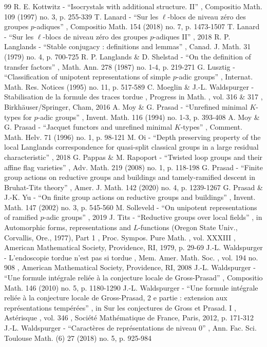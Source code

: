 \documentclass[11pt]{article}
\numberwithin{equation}{section}\providecommand{\og}{«\,}\providecommand{\fg}{\,»}
\theoremstyle{plain}
\theoremstyle{definition}
\begin{document}
\begin{thebibliography}{99}
 R. E. Kottwitz - “Isocrystals with additional structure. II” , Compositio Math. 109 (1997) no. 3, p. 255-339
 T. Lanard - “Sur les $\ell $-blocs de niveau zéro des groupes $p$-adiques” , Compositio Math. 154 (2018) no. 7, p. 1473-1507
 T. Lanard - “Sur les $\ell $-blocs de niveau zéro des groupes $p$-adiques II” , 2018
 R. P. Langlands - “Stable conjugacy : definitions and lemmas” , Canad. J. Math. 31 (1979) no. 4, p. 700-725
 R. P. Langlands \& D. Shelstad - “On the definition of transfer factors” , Math. Ann. 278 (1987) no. 1-4, p. 219-271
 G. Lusztig - “Classification of unipotent representations of simple $p$-adic groups” , Internat. Math. Res. Notices (1995) no. 11, p. 517-589
 C. Moeglin \& J.-L. Waldspurger - Stabilisation de la formule des traces tordue , Progress in Math. , vol. 316 \& 317 , Birkhäuser/Springer, Cham, 2016
 A. Moy \& G. Prasad - “Unrefined minimal $K$-types for $p$-adic groups” , Invent. Math. 116 (1994) no. 1-3, p. 393-408
 A. Moy \& G. Prasad - “Jacquet functors and unrefined minimal $K$-types” , Comment. Math. Helv. 71 (1996) no. 1, p. 98-121
 M. Oi - “Depth preserving property of the local Langlands correspondence for quasi-split classical groups in a large residual characteristic” , 2018
 G. Pappas \& M. Rapoport - “Twisted loop groups and their affine flag varieties” , Adv. Math. 219 (2008) no. 1, p. 118-198
 G. Prasad - “Finite group actions on reductive groups and buildings and tamely-ramified descent in Bruhat-Tits theory” , Amer. J. Math. 142 (2020) no. 4, p. 1239-1267
 G. Prasad \& J.-K. Yu - “On finite group actions on reductive groups and buildings” , Invent. Math. 147 (2002) no. 3, p. 545-560
 M. Solleveld - “On unipotent representations of ramified $p$-adic groups” , 2019
 J. Tits - “Reductive groups over local fields” , in Automorphic forms, representations and $L$-functions (Oregon State Univ., Corvallis, Ore., 1977), Part 1 , Proc. Sympos. Pure Math. , vol. XXXIII , American Mathematical Society, Providence, RI, 1979, p. 29-69
 J.-L. Waldspurger - L’endoscopie tordue n’est pas si tordue , Mem. Amer. Math. Soc. , vol. 194 no. 908 , American Mathematical Society, Providence, RI, 2008
 J.-L. Waldspurger - “Une formule intégrale reliée à la conjecture locale de Gross-Prasad” , Compositio Math. 146 (2010) no. 5, p. 1180-1290
 J.-L. Waldspurger - “Une formule intégrale reliée à la conjecture locale de Gross-Prasad, 2 e partie : extension aux représentations tempérées” , in Sur les conjectures de Gross et Prasad. I , Astérisque , vol. 346 , Société Mathématique de France, Paris, 2012, p. 171-312
 J.-L. Waldspurger - “Caractères de représentations de niveau 0” , Ann. Fac. Sci. Toulouse Math. (6) 27 (2018) no. 5, p. 925-984
\end{thebibliography}
\end{document}
